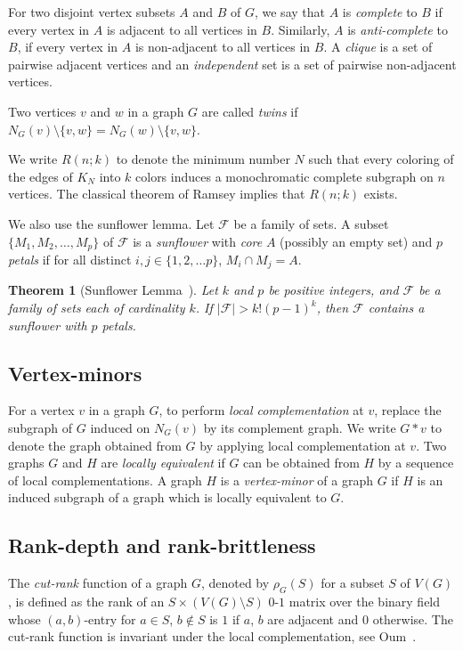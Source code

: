 \documentclass[11pt]{article}
\newtheorem{theorem}{Theorem}[section]
\newcommand\abs[1]{\lvert #1\rvert}
\newcommand\cutrk{\rho}
\newcommand{\cF}{\mathcal{F}}
\begin{document}
	For two disjoint vertex subsets $A$ and $B$ of $G$, 
	we say that $A$ is \emph{complete} to $B$ if
        every vertex in $A$ is adjacent to all vertices in $B$.
	Similarly, $A$ is \emph{anti-complete} to $B$, if
        every vertex in $A$ is non-adjacent to all vertices in $B$.
        A \emph{clique} is a set of pairwise adjacent vertices
        and an \emph{independent} set is a set of pairwise non-adjacent vertices.
        
		Two vertices $v$ and $w$ in a graph $G$ are called \emph{twins} if 
		$N_G(v)\setminus \{v,w\}=N_G(w)\setminus \{v,w\}$.
                
                
		We write $R(n;k)$ to denote the minimum number $N$ such
	that every coloring of the edges of $K_N$ into $k$ colors induces a monochromatic complete subgraph on $n$ vertices. The classical theorem of Ramsey implies that $R(n;k)$ exists.

	We also use the sunflower lemma. Let $\cF$ be a family of sets. 
	A subset $\{M_1, M_2, \ldots, M_p\}$ of $\cF$ is a \emph{sunflower} with \emph{core} $A$ (possibly an empty set) and $p$ \emph{petals} if
	for all distinct $i,j\in \{1,2, \ldots p\}$, $M_i\cap M_j=A$. 
	
	\begin{theorem}[Sunflower Lemma~{\cite[Erd\H{o}s and Rado]{ErdosR1960}}]\label{thm:sunflower}
	Let $k$ and $p$ be positive integers, and 
	$\cF$ be a family of sets each of cardinality $k$. 
	If $\abs{\cF}> k!(p-1)^k$, then $\cF$ contains a sunflower with $p$ petals.
      \end{theorem}

      \subsection{Vertex-minors}
For a vertex $v$ in a graph $G$, to perform \emph{local complementation} at $v$, 
replace the subgraph of $G$ induced on $N_G(v)$ 
by its complement graph. 
We write $G*v$ to denote the graph obtained from $G$ by applying
local complementation at $v$.
Two graphs $G$ and $H$ are \emph{locally equivalent} if $G$ can be obtained from $H$ by a sequence of local complementations.
A graph $H$ is a \emph{vertex-minor} of a graph $G$
if $H$ is an induced subgraph of a graph which is locally equivalent to $G$.


        \subsection{Rank-depth and rank-brittleness}
The \emph{cut-rank} function of a graph $G$, denoted by $\cutrk_G(S)$ for a subset $S$ of $V(G)$,
is defined as the rank of an $S\times (V(G)\setminus S)$ $0$-$1$ matrix over the binary field whose $(a,b)$-entry for $a\in S$, $b\notin S$ is $1$ if $a$, $b$ are adjacent and $0$ otherwise.
The cut-rank function is invariant under the local complementation, see Oum~\cite{Oum2004}.
\end{document}

